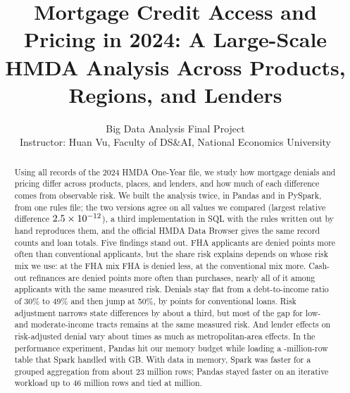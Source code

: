 \documentclass[acmtog,nonacm]{acmart}
\begin{document}
\title[Mortgage Credit Access and Pricing in 2024]{Mortgage Credit Access and Pricing in 2024: A Large-Scale HMDA Analysis Across Products, Regions, and Lenders}
\subtitle{Big Data Analysis Final Project\\Instructor: Huan Vu, Faculty of DS\&AI, National Economics University}

\author{}

\renewcommand{\shortauthors}{Group 9}

\begin{abstract}
Using all \nAll{} records of the 2024 HMDA One-Year file, we study how mortgage denials and pricing differ across products, places, and lenders, and how much of each difference comes from observable risk. We built the analysis twice, in Pandas and in PySpark, from one rules file; the two versions agree on all \eqTotal{} values we compared (largest relative difference $2.5\times10^{-12}$), a third implementation in SQL with the rules written out by hand reproduces them, and the official HMDA Data Browser gives the same record counts and loan totals. Five findings stand out. FHA applicants are denied \kgFHAgap{} points more often than conventional applicants, but the share risk explains depends on whose risk mix we use: at the FHA mix FHA is denied less, at the conventional mix more. Cash-out refinances are denied \kgCOgap{} points more often than purchases, nearly all of it among applicants with the same measured risk. Denials stay flat from a debt-to-income ratio of 30\% to 49\% and then jump at 50\%, by \jumpConvMain{} points for conventional loans. Risk adjustment narrows state differences by about a third, but most of the gap for low- and moderate-income tracts remains at the same measured risk. And lender effects on risk-adjusted denial vary about \twRatio{} times as much as metropolitan-area effects. In the performance experiment, Pandas hit our memory budget while loading a \oomRows{}-million-row table that Spark handled with \spMemOom{} GB. With data in memory, Spark was faster for a grouped aggregation from about 23 million rows; Pandas stayed faster on an iterative workload up to 46 million rows and tied at \lastRows{} million.
\end{abstract}
\end{document}
